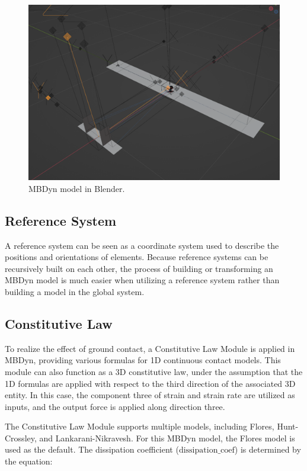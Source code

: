 \begin{figure}[h]
    \centering
    \includegraphics[width=0.9\linewidth]{Images/MBDyn model in blender.png}
    \caption{MBDyn model in Blender.}
    \label{fig:MBDyn_model_in_blender}
\end{figure}

\subsection{Reference System}
A reference system can be seen as a coordinate system used to describe the positions and orientations of elements. Because reference systems can be recursively built on each other, the process of building or transforming an MBDyn model is much easier when utilizing a reference system rather than building a model in the global system.

\subsection{Constitutive Law}
\label{section:Constitutive_law}
To realize the effect of ground contact, a Constitutive Law Module is applied in MBDyn, providing various formulas for 1D continuous contact models. This module can also function as a 3D constitutive law, under the assumption that the 1D formulas are applied with respect to the third direction of the associated 3D entity. In this case, the component three of strain and strain rate are utilized as inputs, and the output force is applied along direction three.

The Constitutive Law Module supports multiple models, including Flores, Hunt-Crossley, and Lankarani-Nikravesh. For this MBDyn model, the Flores model is used as the default. The dissipation coefficient (\(\text{dissipation\_coef}\)) is determined by the equation:

